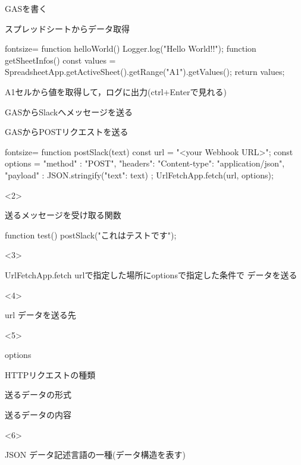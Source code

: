 \documentclass[dvipdfmx,xcolor={svgnames},aspectratio=169]{beamer}
\begin{document}
  \begin{frame}[fragile]{GASを書く}
    \begin{exampleblock}{スプレッドシートからデータ取得}
      \begin{GAS*}{fontsize=\scriptsize}
function helloWorld(){
  Logger.log("Hello World!!");
}
function getSheetInfos(){
  const values = SpreadsheetApp.getActiveSheet().getRange("A1").getValues();
  return values;
}
      \end{GAS*}
    \end{exampleblock}
    \LARGE A1セルから値を取得して，ログに出力(ctrl+Enterで見れる)
  \end{frame}
  \begin{frame}[fragile]{GASからSlackへメッセージを送る}
    \begin{exampleblock}{GASからPOSTリクエストを送る}
      \begin{GAS*}{fontsize=\scriptsize}
function postSlack(text){
  const url = "<your Webhook URL>";
  const options = {
    "method" : "POST",
    "headers": {"Content-type": "application/json"},
    "payload" : JSON.stringify({"text": text})
  };
  UrlFetchApp.fetch(url, options);
}
      \end{GAS*}
    \end{exampleblock}
    \begin{onlyenv}<2>
      \begin{exampleblock}{送るメッセージを受け取る関数}
        \begin{GAS}
function test(){
  postSlack("これはテストです");
}
        \end{GAS}
      \end{exampleblock}
    \end{onlyenv}
    \begin{onlyenv}<3>
      \begin{block}{UrlFetchApp.fetch}
        urlで指定した場所にoptionsで指定した条件で
        データを送る
      \end{block}
    \end{onlyenv}
    \begin{onlyenv}<4>
      \begin{block}{url}
        データを送る先
      \end{block}
    \end{onlyenv}
    \begin{onlyenv}<5>
      \begin{block}{options}
        \begin{description}\normalsize
          \item[method] HTTPリクエストの種類
          \item[headers] 送るデータの形式
          \item[payload] 送るデータの内容
        \end{description}
      \end{block}
    \end{onlyenv}
    \begin{onlyenv}<6>
      \begin{block}{JSON}
        データ記述言語の一種(データ構造を表す)
      \end{block}
    \end{onlyenv}
  \end{frame}
\end{document}
